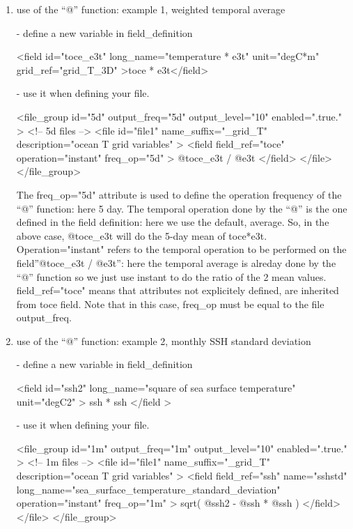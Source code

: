 \documentclass[../main/NEMO_manual]{subfiles}
\begin{document}
\begin{enumerate}
\item use of the ``@'' function: example 1, weighted temporal average

 - define a new variable in field\_definition

\begin{xmllines}
<field id="toce_e3t" long_name="temperature * e3t" unit="degC*m" grid_ref="grid_T_3D" >toce * e3t</field>
\end{xmllines}

 - use it when defining your file.

\begin{xmllines}
<file_group id="5d" output_freq="5d"  output_level="10" enabled=".true." >  <!-- 5d files -->
   <file id="file1" name_suffix="_grid_T" description="ocean T grid variables" >
      <field field_ref="toce" operation="instant" freq_op="5d" > @toce_e3t / @e3t </field>
   </file>
</file_group>
\end{xmllines}

The freq\_op="5d" attribute is used to define the operation frequency of the ``@'' function: here 5 day.
The temporal operation done by the ``@'' is the one defined in the field definition:
here we use the default, average.
So, in the above case, @toce\_e3t will do the 5-day mean of toce*e3t.
Operation="instant" refers to the temporal operation to be performed on the field''@toce\_e3t / @e3t'':
here the temporal average is alreday done by the ``@'' function so we just use instant to do the ratio of
the 2 mean values.
field\_ref="toce" means that attributes not explicitely defined, are inherited from toce field.
Note that in this case, freq\_op must be equal to the file output\_freq.

\item use of the ``@'' function: example 2, monthly SSH standard deviation

 - define a new variable in field\_definition

\begin{xmllines}
<field id="ssh2" long_name="square of sea surface temperature" unit="degC2" > ssh * ssh </field >
\end{xmllines}

 - use it when defining your file.

\begin{xmllines}
<file_group id="1m" output_freq="1m"  output_level="10" enabled=".true." >  <!-- 1m files -->
   <file id="file1" name_suffix="_grid_T" description="ocean T grid variables" >
      <field field_ref="ssh" name="sshstd" long_name="sea_surface_temperature_standard_deviation"
                        operation="instant" freq_op="1m" >
                        sqrt( @ssh2 - @ssh * @ssh )
      </field>
   </file>
</file_group>
\end{xmllines}


\end{enumerate}
\end{document}
